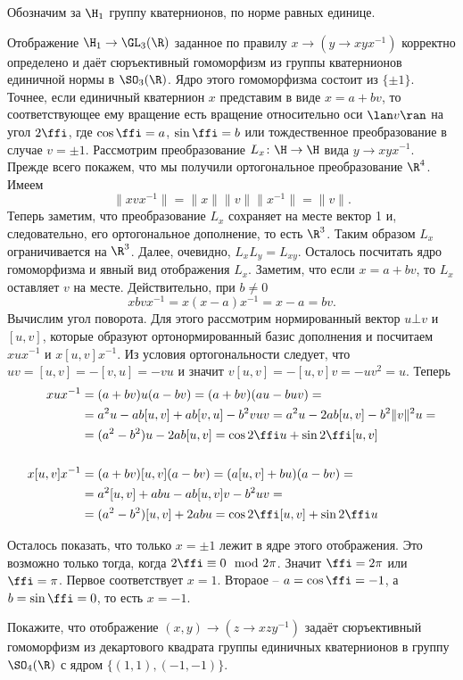\dfn Обозначим за $\H_{1}$ группу кватернионов, по норме равных единице.
\edfn

\thrm Отображение $\H_{1}\to \GL_3(\R)$ заданное по правилу $x\to (y \to xyx^{-1})$ корректно определено и даёт сюръективный  гомоморфизм из группы кватернионов единичной нормы в $\SO_3(\R)$. Ядро этого гомоморфизма состоит из $\{\pm 1\}$. Точнее, если единичный кватернион $x$  представим в виде $x=a+bv$, то соответствующее ему вращение есть вращение относительно  оси $\lan v \ran$ на угол $2\ffi$, где $\cos \ffi= a$, $\sin \ffi= b$ или тождественное преобразование в случае $v=\pm 1$.
\ethrm
\proof Рассмотрим преобразование $L_x \colon \H \to \H$ вида $y \to xyx^{-1}$. Прежде всего покажем, что мы получили ортогональное преобразование $\R^4$. Имеем
 $$\|xvx^{-1}\|=\|x\| \|v\| \|x^{-1}\| = \|v\|.$$
Теперь заметим, что преобразование $L_x$ сохраняет на месте вектор 1 и, следовательно, его ортогональное дополнение, то есть $\R^3$. Таким образом $L_x$ ограничивается на $\R^3$. Далее, очевидно, $L_xL_y= L_{xy}$. Осталось посчитать ядро гомоморфизма и явный вид отображения $L_x$. Заметим, что если $x=a+bv$, то $L_x$ оставляет $v$ на месте. Действительно, при $b\neq 0$ 
$$xbvx^{-1}=x(x-a)x^{-1}= x-a=bv.$$
Вычислим угол поворота. Для этого рассмотрим нормированный вектор  $u\bot v$ и $[u,v]$, которые образуют ортонормированный базис дополнения и посчитаем $xux^{-1}$ и $x[u,v]x^{-1}$. Из условия ортогональности следует, что $uv=[u,v]=-[v,u]=-vu$ и значит $v[u,v]=-[u,v]v=-uv^2=u$. Теперь
\begin{align*}
xux^{-1}&=(a+bv)u(a-bv)= (a+bv)(au-buv)=\\
&=a^2u -ab[u,v]+ab[v,u]- b^2vuv=a^2u-2ab[u,v]-b^2\|v\|^2u=\\ &=(a^2-b^2)u-2ab[u,v]=\cos2\ffi u+ \sin 2\ffi [u,v]
\\
\\
x[u,v]x^{-1}&=(a+bv)[u,v](a-bv)= (a[u,v]+bu)(a-bv)=\\
&=a^2[u,v]+abu-ab[u,v]v-b^2uv=\\
&=(a^2-b^2)[u,v]+2abu=\cos 2\ffi[u,v]+\sin 2\ffi u
\end{align*}

Осталось показать, что только $x=\pm 1$ лежит в ядре этого отображения. Это возможно только тогда, когда $2\ffi \equiv 0 \mod 2\pi$. Значит $\ffi=2 \pi$ или $\ffi= \pi$. Первое соответствует $x=1$. Втораое --  $a=\cos \ffi = -1$, а $b=\sin \ffi = 0$, то есть $x=-1$. 
\endproof


\zd
Покажите, что отображение $(x,y) \to (z \to xzy^{-1})$ задаёт сюръективный гомоморфизм из декартового квадрата группы единичных кватернионов в группу $\SO_4(\R)$ с ядром $\{(1,1),(-1,-1)\}$.
\ezd

